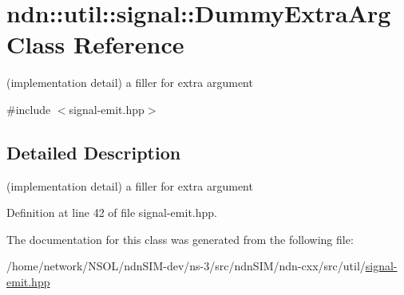 \hypertarget{classndn_1_1util_1_1signal_1_1DummyExtraArg}{}\section{ndn\+:\+:util\+:\+:signal\+:\+:Dummy\+Extra\+Arg Class Reference}
\label{classndn_1_1util_1_1signal_1_1DummyExtraArg}


(implementation detail) a filler for extra argument  




{\ttfamily \#include $<$signal-\/emit.\+hpp$>$}



\subsection{Detailed Description}
(implementation detail) a filler for extra argument 

Definition at line 42 of file signal-\/emit.\+hpp.



The documentation for this class was generated from the following file\+:\begin{DoxyCompactItemize}
\item 
/home/network/\+N\+S\+O\+L/ndn\+S\+I\+M-\/dev/ns-\/3/src/ndn\+S\+I\+M/ndn-\/cxx/src/util/\hyperlink{signal-emit_8hpp}{signal-\/emit.\+hpp}\end{DoxyCompactItemize}
